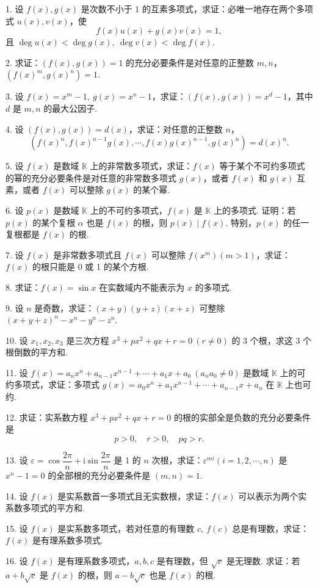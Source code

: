 \documentclass[UTF8, 12pt, fontset=fandol, oneside]{ctexart}
\begin{document}
1. 设 $f(x),g(x)$ 是次数不小于 1 的互素多项式，求证：必唯一地存在两个多项式 $u(x),v(x)$，使
\[
f(x)u(x)+g(x)v(x)=1,
\]
且 $\deg u(x)<\deg g(x),\ \deg v(x)<\deg f(x)$.

2. 求证：$(f(x),g(x))=1$ 的充分必要条件是对任意的正整数 $m,n$，$(f(x)^m,g(x)^n)=1$.

3. 设 $f(x)=x^m-1,\ g(x)=x^n-1$，求证：$(f(x),g(x))=x^d-1$，其中 $d$ 是 $m,n$ 的最大公因子.

4. 设 $(f(x),g(x))=d(x)$，求证：对任意的正整数 $n$，
\[
(f(x)^n,f(x)^{n-1}g(x),\cdots,f(x)g(x)^{n-1},g(x)^n)=d(x)^n.
\]

5. 设 $f(x)$ 是数域 $\mathbb{K}$ 上的非常数多项式，求证：$f(x)$ 等于某个不可约多项式的幂的充分必要条件是对任意的非常数多项式 $g(x)$，或者 $f(x)$ 和 $g(x)$ 互素，或者 $f(x)$ 可以整除 $g(x)$ 的某个幂.

6. 设 $p(x)$ 是数域 $\mathbb{K}$ 上的不可约多项式，$f(x)$ 是 $\mathbb{K}$ 上的多项式. 证明：若 $p(x)$ 的某个复根 $\alpha$ 也是 $f(x)$ 的根，则 $p(x)\mid f(x)$. 特别，$p(x)$ 的任一复根都是 $f(x)$ 的根.

7. 设 $f(x)$ 是非常数多项式且 $f(x)$ 可以整除 $f(x^m)(m>1)$，求证：$f(x)$ 的根只能是 0 或 1 的某个方根.

8. 求证：$f(x)=\sin x$ 在实数域内不能表示为 $x$ 的多项式.

9. 设 $n$ 是奇数，求证：$(x+y)(y+z)(x+z)$ 可整除 $(x+y+z)^n-x^n-y^n-z^n$.

10. 设 $x_1,x_2,x_3$ 是三次方程 $x^3+px^2+qx+r=0\ (r\neq 0)$ 的 3 个根，求这 3 个根倒数的平方和.

11. 设 $f(x)=a_nx^n+a_{n-1}x^{n-1}+\cdots+a_1x+a_0\ (a_na_0\neq 0)$ 是数域 $\mathbb{K}$ 上的可约多项式，求证：多项式 $g(x)=a_0x^n+a_1x^{n-1}+\cdots+a_{n-1}x+a_n$ 在 $\mathbb{K}$ 上也可约.

12. 求证：实系数方程 $x^3+px^2+qx+r=0$ 的根的实部全是负数的充分必要条件是
\[
p>0,\quad r>0,\quad pq>r.
\]

13. 设 $\varepsilon=\cos\dfrac{2\pi}{n}+\mathrm{i}\sin\dfrac{2\pi}{n}$ 是 1 的 $n$ 次根，求证：$\varepsilon^{mi}(i=1,2,\cdots,n)$ 是 $x^n-1=0$ 的全部根的充分必要条件是 $(m,n)=1$.

14. 设 $f(x)$ 是实系数首一多项式且无实数根，求证：$f(x)$ 可以表示为两个实系数多项式的平方和.

15. 设 $f(x)$ 是实系数多项式，若对任意的有理数 $c,\ f(c)$ 总是有理数，求证：$f(x)$ 是有理系数多项式.

16. 设 $f(x)$ 是有理系数多项式，$a,b,c$ 是有理数，但 $\sqrt c$ 是无理数. 求证：若 $a+b\sqrt c$ 是 $f(x)$ 的根，则 $a-b\sqrt c$ 也是 $f(x)$ 的根.
\end{document}

